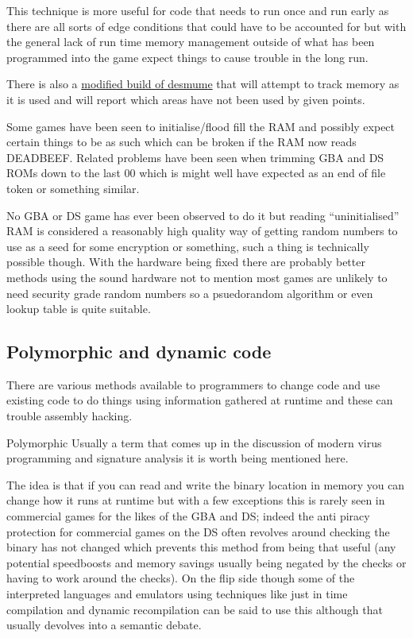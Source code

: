 \documentclass[
]{book}
\begin{document}
This technique is more useful for code that needs to run once and run early as there are all sorts of edge conditions that could have to be accounted for but with the general lack of run time memory management outside of what has been programmed into the game expect things to cause trouble in the long run.

There is also a \href{http://gbatemp.net/threads/unofficial-desmume-build-unused-memory-finder-tool.349332/}{modified build of desmume} that will attempt to track memory as it is used and will report which areas have not been used by given points.

Some games have been seen to initialise/flood fill the RAM and possibly expect certain things to be as such which can be broken if the RAM now reads DEADBEEF. Related problems have been seen when trimming GBA and DS ROMs down to the last 00 which is might well have expected as an end of file token or something similar.

No GBA or DS game has ever been observed to do it but reading ``uninitialised'' RAM is considered a reasonably high quality way of getting random numbers to use as a seed for some encryption or something, such a thing is technically possible though. With the hardware being fixed there are probably better methods using the sound hardware not to mention most games are unlikely to need security grade random numbers so a psuedorandom algorithm or even lookup table is quite suitable.

\hypertarget{polymorphic-and-dynamic-code}{%
\subsection{Polymorphic and dynamic code}\label{polymorphic-and-dynamic-code}}

There are various methods available to programmers to change code and use existing code to do things using information gathered at runtime and these can trouble assembly hacking.

Polymorphic Usually a term that comes up in the discussion of modern virus programming and signature analysis it is worth being mentioned here.

The idea is that if you can read and write the binary location in memory you can change how it runs at runtime but with a few exceptions this is rarely seen in commercial games for the likes of the GBA and DS; indeed the anti piracy protection for commercial games on the DS often revolves around checking the binary has not changed which prevents this method from being that useful (any potential speedboosts and memory savings usually being negated by the checks or having to work around the checks). On the flip side though some of the interpreted languages and emulators using techniques like just in time compilation and dynamic recompilation can be said to use this although that usually devolves into a semantic debate.
\end{document}
